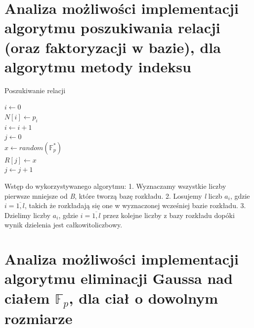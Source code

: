 \documentclass[]{article}
\begin{document}
\section{Analiza możliwości implementacji algorytmu poszukiwania relacji (oraz faktoryzacji w bazie), dla algorytmu metody indeksu}

\begin{algorithm}
	\SetAlgoLined
	\caption{Poszukiwanie relacji}
	\(i \gets 0\) \\
	{
		\(N[i] \gets p_i\)\\
		\(i \gets i + 1\)\\
	}
	\(j \gets 0\) \\
	{
		\(x \gets random(\mathbb{F}_p^*)\)\\
		{
			\(R[j] \gets x\)\\
			\(j \gets j + 1\)\\
		}
	}
\end{algorithm}


Wstęp do wykorzystywanego algorytmu:
1. Wyznaczamy wszystkie liczby pierwsze mniejsze od \textit{B}, które tworzą bazę rozkładu.
2. Losujemy \textit{l} liczb $a_i$, gdzie $i=\overline{1,l}$, takich że rozkładają się one w wyznaczonej wcześniej bazie rozkładu.
3. Dzielimy liczby $a_i$, gdzie $i=\overline{1,l}$ przez kolejne liczby z bazy rozkładu dopóki wynik dzielenia jest całkowitoliczbowy.\newline


\section{Analiza możliwości implementacji algorytmu eliminacji Gaussa nad ciałem $\mathbb{F}_p$, dla ciał o dowolnym rozmiarze}~
\end{document}
